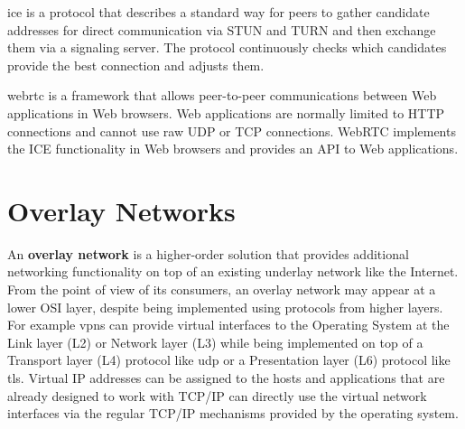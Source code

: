 
\gls{ice} is a protocol that describes a standard way for peers to
gather candidate addresses for direct communication via STUN and TURN
and then exchange them via a signaling server. The protocol continuously
checks which candidates provide the best connection and adjusts them.

\gls{webrtc} is a framework that allows peer-to-peer communications
between Web applications in Web browsers. Web applications are normally
limited to HTTP connections and cannot use raw UDP or TCP connections.
WebRTC implements the ICE functionality in Web browsers and provides an
API to Web applications.


\hypertarget{sec:overlays}{%
\chapter{Overlay Networks}\label{sec:overlays}}

An \textbf{overlay network} is a higher-order solution that provides
additional networking functionality on top of an existing underlay
network like the Internet. From the point of view of its consumers, an
overlay network may appear at a lower OSI layer, despite being
implemented using protocols from higher layers. For example \glspl{vpn}
can provide virtual interfaces to the Operating System at the Link layer
(L2) or Network layer (L3) while being implemented on top of a Transport
layer (L4) protocol like \gls{udp} or a Presentation layer (L6) protocol
like \gls{tls}. Virtual IP addresses can be assigned to the hosts and
applications that are already designed to work with TCP/IP can directly
use the virtual network interfaces via the regular TCP/IP mechanisms
provided by the operating system.

